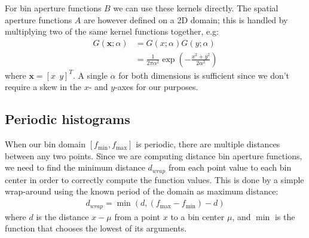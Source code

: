 \documentclass[thesis.tex]{subfiles}
\def\x{\mathbf{x}}
\begin{document}
For bin aperture functions $B$ we can use these kernels directly. The spatial aperture functions $A$ are however defined on a 2D domain; this is handled by multiplying two of the same kernel functions together, e.g:
%
\begin{align*}
G(\x;\alpha) &= G(x;\alpha) G(y;\alpha) \\
&= \frac{1}{2\pi \alpha^2}
\exp\left( -\frac{x^2 + y^2}{2 \alpha^2} \right)
\end{align*}
%
where $\x = [x ~~ y]^T$. A single $\alpha$ for both dimensions is sufficient since we don't require a skew in the $x$- and $y$-axes for our purposes.
%
\subsection{Periodic histograms}
\label{sec:histogramPeriodic}
When our bin domain $[f_\text{min}, f_\text{max}]$ is periodic, there are multiple distances between any two points. Since we are computing distance bin aperture functions, we need to find the minimum distance $d_{wrap}$ from each point value to each bin center in order to correctly compute the function values. This is done by a simple wrap-around using the known period of the domain as maximum distance:
\begin{align*}
	d_{wrap} = \min(d,(f_\text{max} - f_\text{min})-d)
\end{align*}
where $d$ is the distance $x - \mu$ from a point $x$ to a bin center $\mu$, and $\min$ is the function that chooses the lowest of its arguments.
\end{document}
